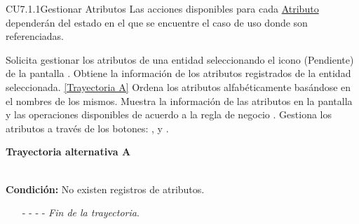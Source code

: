 	\begin{UseCase}{CU7.1.1}{Gestionar Atributos}{
     	Las acciones disponibles para cada \hyperlink{atributoEntidad}{Atributo} dependerán del estado en el que se encuentre el caso de uso donde son referenciadas. 
	}
	
\end{UseCase}
\begin{UCtrayectoria}
	\UCpaso[\UCactor] Solicita gestionar los atributos de una entidad seleccionando el icono (Pendiente) de la pantalla .
	\UCpaso[\UCsist] Obtiene la información de los atributos registrados de la entidad seleccionada. \hyperlink{CU7:TAA}{[Trayectoria A]}
	\UCpaso[\UCsist] Ordena los atributos alfabéticamente basándose en el nombres de los mismos.
	\UCpaso[\UCsist] Muestra la información de las atributos en la pantalla  y las operaciones disponibles de acuerdo a la regla de negocio . \label{CU7-1-1-P4}
	\UCpaso[\UCactor] Gestiona los atributos a través de los botones: , \editar y \eliminar. 
\end{UCtrayectoria}		
\hypertarget{CU7:TAA}{\textbf{Trayectoria alternativa A}}\\
\noindent \textbf{Condición:} No existen registros de atributos.
\begin{enumerate}
	\UCpaso[\UCsist] Muestra el mensaje  en la pantalla  para indicar que no hay registros de atributos para mostrar.  \label{CU7-1-1-TA1}
	\UCpaso[\UCactor] Gestiona los atributos a través del botón: . 
	\item[- -] - - {\em {Fin de la trayectoria}}.%
\end{enumerate}
